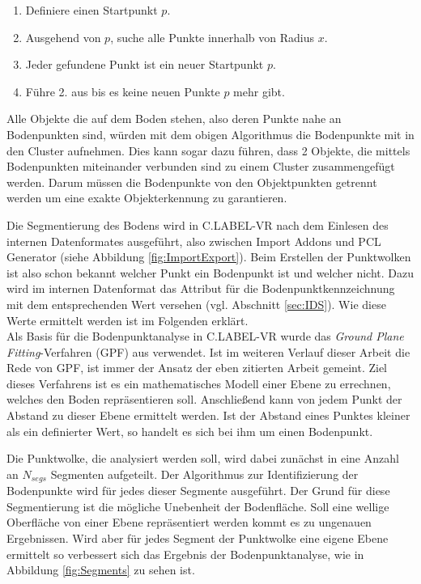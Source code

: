 \begin{enumerate}
\item Definiere einen Startpunkt $p$.
\item Ausgehend von $p$, suche alle Punkte innerhalb von Radius \(x\). 
\item Jeder gefundene Punkt ist ein neuer Startpunkt $p$.
\item Führe 2. aus bis es keine neuen Punkte $p$ mehr gibt.
\end{enumerate} 

Alle Objekte die auf dem Boden stehen, also deren Punkte nahe an Bodenpunkten sind, würden mit dem obigen Algorithmus die Bodenpunkte mit in den Cluster aufnehmen. Dies kann sogar dazu führen, dass 2 Objekte, die mittels Bodenpunkten miteinander verbunden sind zu einem Cluster zusammengefügt werden. Darum müssen die Bodenpunkte von den Objektpunkten getrennt werden um eine exakte Objekterkennung zu garantieren.

Die Segmentierung des Bodens wird in C.LABEL-VR nach dem Einlesen des internen Datenformates ausgeführt, also zwischen Import Addons und PCL Generator (siehe Abbildung \ref{fig:ImportExport}). Beim Erstellen der Punktwolken ist also schon bekannt welcher Punkt ein Bodenpunkt ist und welcher nicht. Dazu wird im internen Datenformat das Attribut für die Bodenpunktkennzeichnung mit dem entsprechenden Wert versehen (vgl. Abschnitt \ref{sec:IDS}). Wie diese Werte ermittelt werden ist im Folgenden erklärt.\\

Als Basis für die Bodenpunktanalyse in C.LABEL-VR wurde das \textit{Ground Plane Fitting}-Verfahren (GPF) aus \cite{bib:Segmentation1} verwendet. Ist im weiteren Verlauf dieser Arbeit die Rede von GPF, ist immer der Ansatz der eben zitierten Arbeit gemeint. Ziel dieses Verfahrens ist es ein mathematisches Modell einer Ebene zu errechnen, welches den Boden repräsentieren soll. Anschließend kann von jedem Punkt der Abstand zu dieser Ebene ermittelt werden. Ist der Abstand eines Punktes kleiner als ein definierter Wert, so handelt es sich bei ihm um einen Bodenpunkt.

Die Punktwolke, die analysiert werden soll, wird dabei zunächst in eine Anzahl an $N_{segs}$ Segmenten aufgeteilt. Der Algorithmus zur Identifizierung der Bodenpunkte wird für jedes dieser Segmente ausgeführt. Der Grund für diese Segmentierung ist die mögliche Unebenheit der Bodenfläche. Soll eine wellige Oberfläche von einer Ebene repräsentiert werden kommt es zu ungenauen Ergebnissen. Wird aber für jedes Segment der Punktwolke eine eigene Ebene ermittelt so verbessert sich das Ergebnis der Bodenpunktanalyse, wie in Abbildung \ref{fig:Segments} zu sehen ist.

